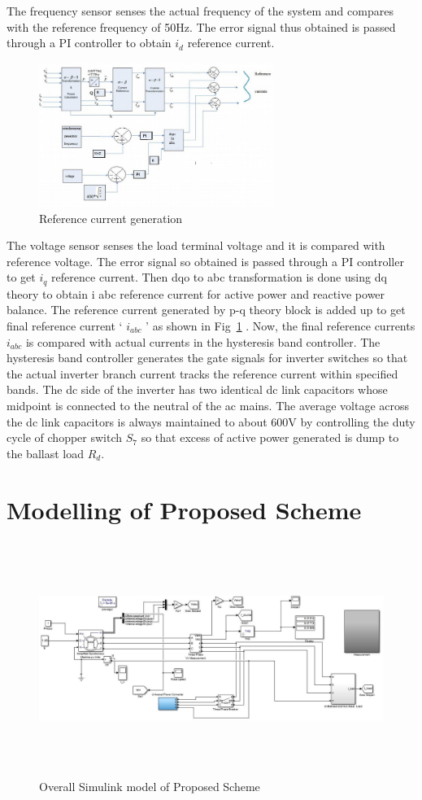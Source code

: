 \documentclass[journal,twoside]{IEEEtran}
\begin{document}
\bigskip
The frequency sensor senses the actual frequency of the
system and compares with the reference frequency of 50Hz.
The error signal thus obtained is passed through a PI controller
to obtain $i_d$ reference current. 
\begin{figure}[!ht]
\centering
\includegraphics[width=3in]{5}
\caption{Reference current generation}
\label{f5}
\end{figure}
The voltage sensor senses the
load terminal voltage and it is compared with reference
voltage. The error signal so obtained is passed through a PI
controller to get $i_q$ reference current. Then dqo to abc
transformation is done using dq theory to obtain i abc reference
current for active power and reactive power balance. The
reference current generated by p-q theory block is added up to
get final reference current ‘ $i_{abc}$ ’ as shown in Fig~\ref{f5} . Now, the
final reference currents $i_{abc}$ is compared with actual currents in
the hysteresis band controller. The hysteresis band controller
generates the gate signals for inverter switches so that the
actual inverter branch current tracks the reference current
within specified bands. The dc side of the inverter has two
identical dc link capacitors whose midpoint is connected to the
neutral of the ac mains. The average voltage across the dc link
capacitors is always maintained to about 600V by controlling
the duty cycle of chopper switch $S_7$ so that excess of active
power generated is dump to the ballast load $R_d$.
	


\section{Modelling of Proposed Scheme}


\begin{figure}[!ht]
\centering
\includegraphics[height=3in,width=6in, angle =90]{6}
\caption{Overall Simulink model of Proposed Scheme}
\label{f6}
\end{figure}
\end{document}

